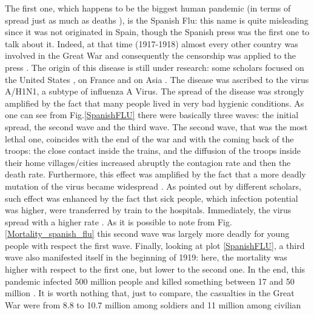 \documentclass[
12pt, %
a4paper, %
oneside, %
headinclude,footinclude, %
BCOR5mm, %
]{scrartcl}
\begin{document}
 The first one, which happens to be the biggest human pandemic (in terms of spread just as much as deaths \cite{potter2001history} ), is the Spanish Flu: this name is quite misleading since it was not originated in Spain, though the Spanish press was the first one to talk about it. Indeed, at that time (1917-1918) almost every other country was involved in the Great War and consequently the censorship was applied to the press . The origin of this disease is still under research: some scholars focused on the United States \cite{crosby_2003,barry2004site}, on France \cite{shanks2016no} and on Asia \cite{langford2005did}.  The disease was ascribed to the virus A/H1N1, a subtype of influenza A Virus. The spread of the disease was strongly amplified by the fact that many people lived in very bad hygienic conditions. As one can see from Fig.\ref{SpanishFLU} there were basically three waves: the initial spread, the second wave and the third wave. The second wave, that was the most lethal one, coincides with the end of the war and with the coming back of the troops: the close contact inside the trains, and the diffusion of the troops inside their home villages/cities increased abruptly the contagion rate and then the death rate. Furthermore, this effect was amplified by the fact that a more deadly mutation of the virus became widespread \cite{barry2008cross}. As pointed out by different scholars, such effect was enhanced by the fact thst sick people, which infection potential was higher, were transferred by train to the hospitals. Immediately, the virus spread with a higher rate \cite{wever2014death}. As it is possible to note from Fig. \ref{Mortality_spanish_flu} this second wave was largely more deadly for young people with respect the first wave. Finally, looking at plot \ref{SpanishFLU}, a third wave also manifested itself in the beginning of 1919: here, the mortality was higher with respect to the first one, but lower to the second one. In the end, this pandemic infected 500 million people and killed something between 17 and 50 million \cite{spreeuwenberg2018reassessing}. It is worth nothing that, just to compare, the casualties in the Great War were from 8.8 to 10.7 million among soldiers and 11 million among civilian \cite{haythornthwaite1996world}
\end{document}
